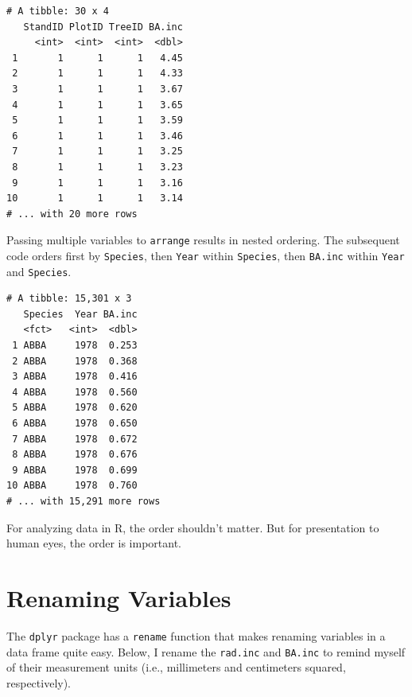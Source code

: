 \documentclass[]{krantz}
\makeatletter
\newenvironment{Shaded}{\begin{snugshade}}{\end{snugshade}}
\newcommand{\KeywordTok}[1]{\textcolor[rgb]{0.27,0.27,0.27}{\textbf{#1}}}
\newcommand{\NormalTok}[1]{#1}
\newcommand{\OperatorTok}[1]{\textcolor[rgb]{0.43,0.43,0.43}{\textbf{#1}}}
\newcommand{\StringTok}[1]{\textcolor[rgb]{0.5,0.5,0.5}{#1}}
\newenvironment{kframe}{%
\medskip{}
\setlength{\fboxsep}{.8em}
 \def\at@end@of@kframe{}%
 \ifinner\ifhmode%
  \def\at@end@of@kframe{\end{minipage}}%
  \begin{minipage}{\columnwidth}%
 \fi\fi%
 \def\FrameCommand##1{\hskip\@totalleftmargin \hskip-\fboxsep
 \colorbox{shadecolor}{##1}\hskip-\fboxsep
     \hskip-\linewidth \hskip-\@totalleftmargin \hskip\columnwidth}%
 \MakeFramed {\advance\hsize-\width
   \@totalleftmargin\z@ \linewidth\hsize
   \@setminipage}}%
 {\par\unskip\endMakeFramed%
 \at@end@of@kframe}
\renewenvironment{Shaded}{\begin{kframe}}{\end{kframe}}
\makeatother
\begin{document}
\begin{verbatim}
# A tibble: 30 x 4
   StandID PlotID TreeID BA.inc
     <int>  <int>  <int>  <dbl>
 1       1      1      1   4.45
 2       1      1      1   4.33
 3       1      1      1   3.67
 4       1      1      1   3.65
 5       1      1      1   3.59
 6       1      1      1   3.46
 7       1      1      1   3.25
 8       1      1      1   3.23
 9       1      1      1   3.16
10       1      1      1   3.14
# ... with 20 more rows
\end{verbatim}

Passing multiple variables to \texttt{arrange} results in nested ordering. The subsequent code orders first by \texttt{Species}, then \texttt{Year} within \texttt{Species}, then \texttt{BA.inc} within \texttt{Year} and \texttt{Species}.

\begin{Shaded}
\end{Shaded}

\begin{verbatim}
# A tibble: 15,301 x 3
   Species  Year BA.inc
   <fct>   <int>  <dbl>
 1 ABBA     1978  0.253
 2 ABBA     1978  0.368
 3 ABBA     1978  0.416
 4 ABBA     1978  0.560
 5 ABBA     1978  0.620
 6 ABBA     1978  0.650
 7 ABBA     1978  0.672
 8 ABBA     1978  0.676
 9 ABBA     1978  0.699
10 ABBA     1978  0.760
# ... with 15,291 more rows
\end{verbatim}

For analyzing data in R, the order shouldn't matter. But for presentation to human eyes, the order is important.

\hypertarget{renaming-variables}{%
\section{Renaming Variables}\label{renaming-variables}}

The \texttt{dplyr} package has a \texttt{rename} function that makes renaming variables in a data frame quite easy. Below, I rename the \texttt{rad.inc} and \texttt{BA.inc} to remind myself of their measurement units (i.e., millimeters and centimeters squared, respectively).
\end{document}
